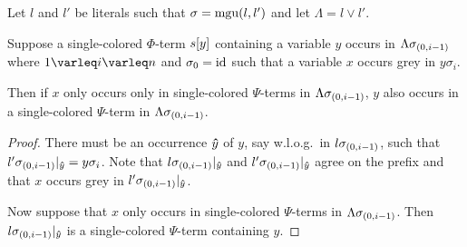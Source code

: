 \documentclass[,%
	draft=false,%
	numbers=noendperiod
	11pt,
	a4paper,
	oneside,%
	openany,
]{memoir}
\begin{document}
\begin{lemma}
	Let $l$ and $l'$ be literals such that $\sigma = \operatorname{mgu}(l, l')$
	and let $\Lambda = l\lor l'$.

	Suppose a single-colored $\Phi$-term $s[y]$ containing a variable $y$ occurs in $\Lambda\sigma_{(0,i-1)}$ where $1\varleq i \varleq n$ and $\sigma_0 = \operatorname{id}$ such that 
	a variable $x$ occurs grey in $y\sigma_i$.

	Then if $x$ only occurs only in single-colored $\Psi$-terms in $\Lambda\sigma_{(0,i-1)}$, $y$ also occurs in a single-colored $\Psi$-term in $\Lambda\sigma_{(0,i-1)}$.
\end{lemma}
\begin{proof}
	There must be an occurrence $\bm\hat y$ of $y$, say w.l.o.g.\ in $l\sigma_{(0,i-1)}$,
	such that $l'\sigma_{(0,i-1)}|_{\bm\hat y} = y\sigma_i$.
	Note that $l\sigma_{(0,i-1)}|_{\bm\hat y}$ and $l'\sigma_{(0,i-1)}|_{\bm\hat y}$ agree on the prefix and that $x$ occurs grey in $l'\sigma_{(0,i-1)}|_{\bm\hat y}$.

	Now suppose that $x$ only occurs in single-colored $\Psi$-terms in $\Lambda\sigma_{(0,i-1)}$.
	Then $l\sigma_{(0,i-1)}|_{\bm\hat y}$ is a single-colored $\Psi$-term containing $y$.
\end{proof}
\end{document}
